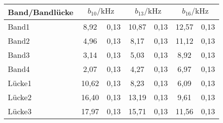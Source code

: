 \label{tab:mu}
	\begin{tabular}{lS[table-format=2.2]@{${}\pm{}$}S[table-format=1.2]S[table-format=2.2]@{${}\pm{}$}S[table-format=1.2]S[table-format=2.2]@{${}\pm{}$}S[table-format=1.2]}
		\toprule
		{Band/Bandlücke} &  &  &  \\
		\midrule
		 Band1  &  8,92 & 0,13 & 10,87 & 0,13 & 12,57 & 0,13\\
		 Band2  &  4,96 & 0,13 &  8,17 & 0,13 & 11,12 & 0,13\\
		 Band3  &  3,14 & 0,13 &  5,03 & 0,13 &  8,92 & 0,13\\
		 Band4  &  2,07 & 0,13 &  4,27 & 0,13 &  6,97 & 0,13\\
		 Lücke1 & 10,62 & 0,13 &  8,23 & 0,13 &  6,09 & 0,13\\
		 Lücke2 & 16,40 & 0,13 & 13,19 & 0,13 &  9,61 & 0,13\\
		 Lücke3 & 17,97 & 0,13 & 15,71 & 0,13 & 11,56 & 0,13\\
		\bottomrule
	\end{tabular}
